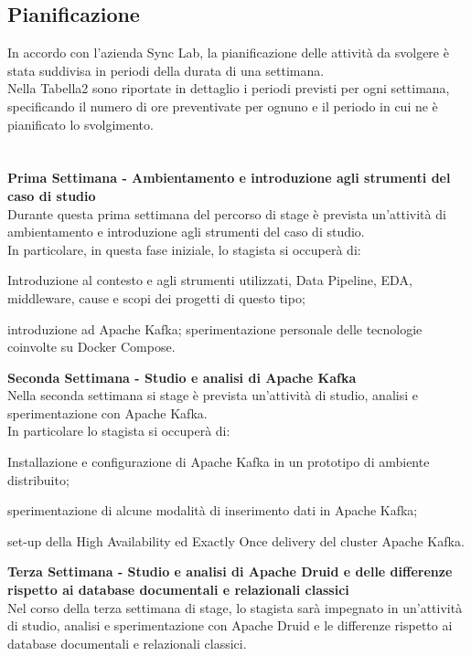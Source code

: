 \subsection{Pianificazione}
In accordo con l'azienda Sync Lab, la pianificazione delle attività da svolgere è stata suddivisa in periodi della durata di una settimana. \\
Nella Tabella2 sono riportate in dettaglio i periodi previsti per ogni settimana, specificando il numero di ore preventivate per ognuno e il periodo in cui ne è pianificato lo svolgimento.
\\
\\
\\
\textbf{Prima Settimana - Ambientamento e introduzione agli strumenti del caso di studio}\\
Durante questa prima settimana del percorso di stage è prevista un'attività di ambientamento e introduzione agli strumenti del caso di studio. \\
In particolare, in questa fase iniziale, lo stagista si occuperà di:
\begin{list}{*}{}
    \item Introduzione al contesto e agli strumenti utilizzati, \gls{Data Pipeline}{}, EDA, middleware, cause e
    scopi dei progetti di questo tipo;
    \item introduzione ad Apache Kafka; sperimentazione personale delle tecnologie coinvolte su Docker
    Compose.
\end{list} 
\pagebreak
\textbf{Seconda Settimana - Studio e analisi di Apache Kafka}\\
Nella seconda settimana si stage è prevista un'attività di studio, analisi e sperimentazione con Apache Kafka. \\
In particolare lo stagista si occuperà di:
\begin{list}{*}{}
    \item Installazione e configurazione di Apache Kafka in un prototipo di ambiente distribuito;
    \item sperimentazione di alcune modalità di inserimento dati in Apache Kafka;
    \item set-up della High Availability ed Exactly Once delivery del cluster Apache Kafka.
\end{list}
\textbf{Terza Settimana - Studio e analisi di Apache Druid e delle differenze rispetto ai database
documentali e relazionali classici}\\
Nel corso della terza settimana di stage, lo stagista sarà impegnato in un'attività di studio, analisi e sperimentazione con Apache Druid e le differenze rispetto ai database documentali e relazionali classici. \\

